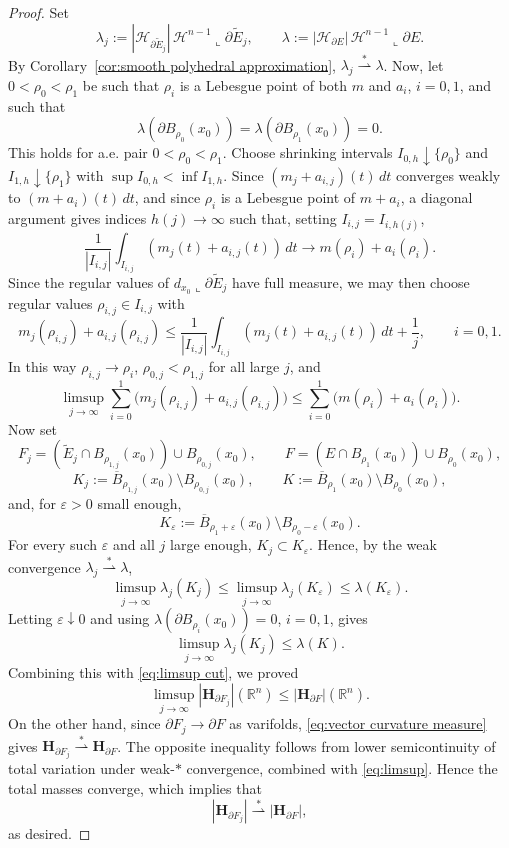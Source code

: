 \documentclass[reqno,11pt]{amsart}
\newcommand{\R}{\mathbb R}
\newcommand{\HH}{\mathscr H}
\numberwithin{equation}{section}
\theoremstyle{remark}
\begin{document}
\begin{proof}
Set
\[
\lambda_j:=|\mathcal H_{\partial\widetilde E_j}|\,
\HH^{n-1}\llcorner\partial\widetilde E_j,\qquad
\lambda:=|\mathcal H_{\partial E}|\,
\HH^{n-1}\llcorner\partial E .
\]
By Corollary~\ref{cor:smooth polyhedral approximation},
$\lambda_j\stackrel{*}{\rightharpoonup}\lambda$. Now, let
$0<\rho_0<\rho_1$ be such that $\rho_i$ is a Lebesgue point of both $m$ and $a_i$, $i=0,1$, 
 and such that
\[
\lambda(\partial B_{\rho_0}(x_0))=\lambda(\partial B_{\rho_1}(x_0))=0.
\]
This holds for a.e. pair $0<\rho_0<\rho_1$. Choose shrinking intervals
$I_{0,h}\downarrow\{\rho_0\}$ and $I_{1,h}\downarrow\{\rho_1\}$ with
$\sup I_{0,h}<\inf I_{1,h}$. Since
$(m_j+a_{i,j})(t)\,dt$ converges weakly to $(m+a_i)(t)\,dt$, and since
$\rho_i$ is a Lebesgue point of $m+a_i$, a diagonal argument gives indices
$h(j)\to\infty$ such that, setting $I_{i,j}=I_{i,h(j)}$,
\[
\frac1{|I_{i,j}|}\int_{I_{i,j}}(m_j(t)+a_{i,j}(t))\,dt
\to m(\rho_i)+a_i(\rho_i).
\]
Since the regular values of $d_{x_0}\llcorner\partial\widetilde E_j$ have full
measure, we may then choose regular values $\rho_{i,j}\in I_{i,j}$ with
\[
m_j(\rho_{i,j})+a_{i,j}(\rho_{i,j})
\le \frac1{|I_{i,j}|}\int_{I_{i,j}}(m_j(t)+a_{i,j}(t))\,dt+\frac1j,
\qquad i=0,1 .
\]
In this way $\rho_{i,j}\to\rho_i$, $\rho_{0,j}<\rho_{1,j}$ for all large $j$,
and
\begin{equation}
    \label{eq:limsup cut}
    \limsup_{j\to\infty}\sum_{i=0}^1
\bigl(m_j(\rho_{i,j})+a_{i,j}(\rho_{i,j})\bigr)
\le \sum_{i=0}^1\bigl(m(\rho_i)+a_i(\rho_i)\bigr).
\end{equation}
Now set
\[
F_j=(\widetilde E_j\cap B_{\rho_{1,j}}(x_0))\cup B_{\rho_{0,j}}(x_0),
\qquad
F=(E\cap B_{\rho_1}(x_0))\cup B_{\rho_0}(x_0),
\]
\[
K_j:=\overline B_{\rho_{1,j}}(x_0)\setminus B_{\rho_{0,j}}(x_0),
\qquad
K:=\overline B_{\rho_1}(x_0)\setminus B_{\rho_0}(x_0),
\]
and, for $\varepsilon>0$ small enough,
\[
K_\varepsilon:=\overline B_{\rho_1+\varepsilon}(x_0)
\setminus B_{\rho_0-\varepsilon}(x_0).
\]
For every such $\varepsilon$ and all $j$ large enough,
$K_j\subset K_\varepsilon$. Hence, by the weak
convergence $\lambda_j\stackrel{*}{\rightharpoonup}\lambda$,
\[
\limsup_{j\to\infty}\lambda_j(K_j)
\le
\limsup_{j\to\infty}\lambda_j(K_\varepsilon)
\le \lambda(K_\varepsilon).
\]
Letting $\varepsilon\downarrow0$ and using
$\lambda(\partial B_{\rho_i}(x_0))=0$, $i=0,1$, gives
\[
\limsup_{j\to\infty}\lambda_j(K_j)\le \lambda(K).
\]
Combining this with \eqref{eq:limsup cut}, we proved
\begin{equation}
    \label{eq:limsup}
\limsup_{j\to\infty}|\mathbf H_{\partial F_j}|(\R^n)
\le |\mathbf H_{\partial F}|(\R^n).
\end{equation}
On the other hand, since
$\partial F_j\to\partial F$ as varifolds, 
\eqref{eq:vector curvature measure} gives
$\mathbf H_{\partial F_j}\stackrel{*}{\rightharpoonup}\mathbf H_{\partial F}$.
The opposite inequality follows from lower semicontinuity of total variation
under weak-$*$ convergence, combined with \eqref{eq:limsup}. Hence the total
masses converge, which implies that
\[
|\mathbf H_{\partial F_j}|\stackrel{*}{\rightharpoonup}
|\mathbf H_{\partial F}|,
\]
as desired.
\end{proof}
\end{document}
